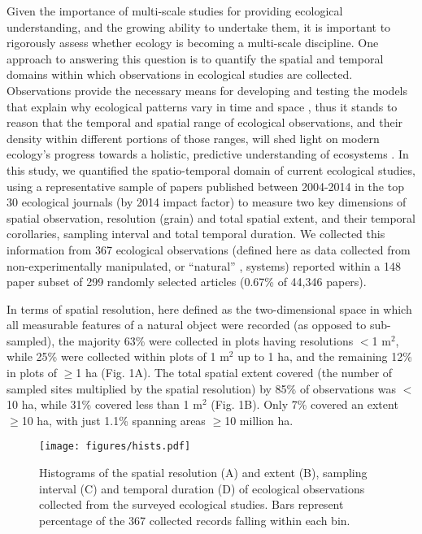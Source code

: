 \documentclass[12pt]{article}
\begin{document}
Given the importance of multi-scale studies for providing ecological understanding, and the growing ability to undertake them, it is important to rigorously assess whether ecology is becoming a multi-scale discipline. One approach to answering this question is to quantify the spatial and temporal domains within which observations in ecological studies are collected. Observations provide the necessary means for developing and testing the models that explain why ecological patterns vary in time and space \cite{levin_problem_1992,tilman_ecological_1989}, thus it stands to reason that the temporal and spatial range of ecological observations, and their density within different portions of those ranges, will shed light on modern ecology's progress towards a holistic, predictive understanding of ecosystems \cite{chave_problem_2013,levin_problem_1992}. In this study, we quantified the spatio-temporal domain of current ecological studies, using a representative sample of papers published between 2004-2014 in the top 30 ecological journals (by 2014 impact factor) to measure two key dimensions of spatial observation, resolution (grain) and total spatial extent, and their temporal corollaries, sampling interval and total temporal duration. We collected this information from 367 ecological observations (defined here as data collected from non-experimentally manipulated, or ``natural'' \cite{tilman_ecological_1989}, systems) reported within a 148 paper subset of 299 randomly selected articles (0.67\% of 44,346 papers). 

In terms of spatial resolution, here defined as the two-dimensional space in which all measurable features of a natural object were recorded (as opposed to sub-sampled), the majority 63\% were collected in plots having resolutions $<$1 m$^2$, while 25\% were collected within plots of 1 m$^2$ up to 1 ha, and the remaining 12\% in plots of $\geq$1 ha (Fig. 1A). The total spatial extent covered (the number of sampled sites multiplied by the spatial resolution) by 85\% of observations was $<$10 ha, while 31\% covered less than 1 m$^2$ (Fig. 1B).  Only 7\% covered an extent $\geq$10 ha, with just 1.1\% spanning areas $\geq$10 million ha. 

\begin{figure}[!ht]
\texttt{[image: figures/hists.pdf]}
\vspace{-0.15 cm}
\caption{Histograms of the spatial resolution (A) and extent (B), sampling interval (C) and temporal duration (D) of ecological observations collected from the surveyed ecological studies. Bars represent percentage of the 367 collected records falling within each bin.}
\label{afoto1}
\end{figure}
\end{document}
